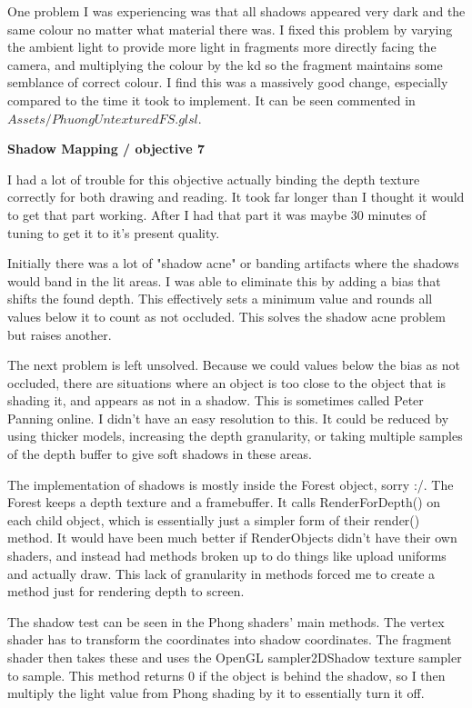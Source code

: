 \documentclass[10pt]{article}
\begin{document}
	One problem I was experiencing was that all shadows appeared very dark and the same colour no matter what material there was. I fixed this problem by varying the ambient light to provide more light in fragments more directly facing the camera, and multiplying the colour by the kd so the fragment maintains some semblance of correct colour. I find this was a massively good change, especially compared to the time it took to implement. It can be seen commented in $Assets/PhuongUntexturedFS.glsl$.
	
	\begin{center}
		\bf Shadow Mapping / objective 7
	\end{center}
	
	I had a lot of trouble for this objective actually binding the depth texture correctly for both drawing and reading. It took far longer than I thought it would to get that part working. After I had that part it was maybe 30 minutes of tuning to get it to it's present quality.
	
	Initially there was a lot of "shadow acne" or banding artifacts where the shadows would band in the lit areas. I was able to eliminate this by adding a bias that shifts the found depth. This effectively sets a minimum value and rounds all values below it to count as not occluded. This solves the shadow acne problem but raises another.
	
	The next problem is left unsolved. Because we could values below the bias as not occluded, there are situations where an object is too close to the object that is shading it, and appears as not in a shadow. This is sometimes called Peter Panning online. I didn't have an easy resolution to this. It could be reduced by using thicker models, increasing the depth granularity, or taking multiple samples of the depth buffer to give soft shadows in these areas.

	The implementation of shadows is mostly inside the Forest object, sorry :/. The Forest keeps a depth texture and a framebuffer. It calls RenderForDepth() on each child object, which is essentially just a simpler form of their render() method. It would have been much better if RenderObjects didn't have their own shaders, and instead had methods broken up to do things like upload uniforms and actually draw. This lack of granularity in methods forced me to create a method just for rendering depth to screen.
	
	The shadow test can be seen in the Phong shaders' main methods. The vertex shader has to transform the coordinates into shadow coordinates. The fragment shader then takes these and uses the OpenGL sampler2DShadow texture sampler to sample. This method returns 0 if the object is behind the shadow, so I then multiply the light value from Phong shading by it to essentially turn it off.
	
\end{document}
